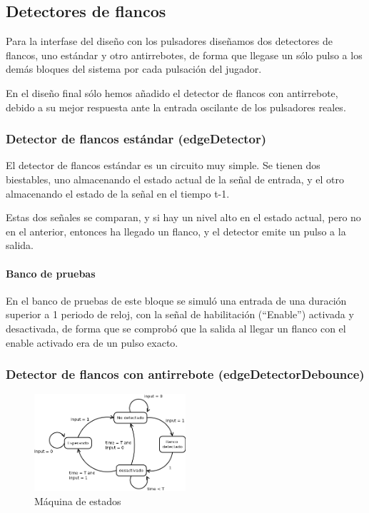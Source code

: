 \subsection{Detectores de flancos}
\label{edgeDetectors}

Para la interfase del diseño con los pulsadores diseñamos dos detectores de flancos, uno estándar y otro antirrebotes, de forma que llegase un sólo pulso a los demás bloques del sistema por cada pulsación del jugador.

En el diseño final sólo hemos añadido el detector de flancos con antirrebote, debido a su mejor respuesta ante la entrada oscilante de los pulsadores reales.

\subsubsection{Detector de flancos estándar (edgeDetector)}
\label{edgeDetectorStd}
El detector de flancos estándar es un circuito muy simple. Se tienen dos biestables, uno almacenando el estado actual de la señal de entrada, y el otro almacenando el estado de la señal en el tiempo t-1.

Estas dos señales se comparan, y si hay un nivel alto en el estado actual, pero no en el anterior, entonces ha llegado un flanco, y el detector emite un pulso a la salida.

\paragraph{Banco de pruebas}
En el banco de pruebas de este bloque se simuló una entrada de una duración superior a 1 periodo de reloj, con la señal de habilitación (``Enable'') activada y desactivada, de forma que se comprobó que la salida al llegar un flanco con el enable activado era de un pulso exacto.

\subsubsection{Detector de flancos con antirrebote (edgeDetectorDebounce)}
\label{edgeDetectorDebounce}

\begin{figure}[H]
	\centering
	\includegraphics[width=0.5\textwidth]{edgeDetectorDebounceFSM.png}
	\caption{Máquina de estados}\label{fig:edgeDetectorDebounceFSM}
\end{figure}

